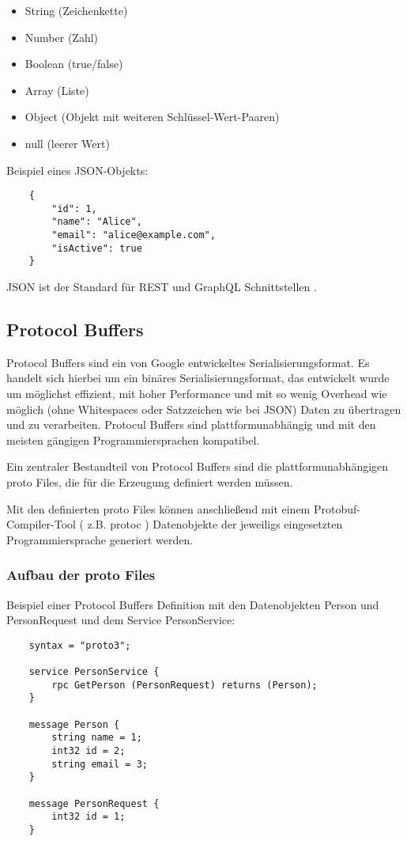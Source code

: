 \begin{itemize}
	\item String (Zeichenkette)
	\item Number (Zahl)
	\item Boolean (true/false)
	\item Array (Liste)
	\item Object (Objekt mit weiteren Schl\"ussel-Wert-Paaren)
	\item null (leerer Wert)
\end{itemize}
\parencite{ecma404-2017}

Beispiel eines JSON-Objekts:
\begin{verbatim}
	{
		"id": 1,
		"name": "Alice",
		"email": "alice@example.com",
		"isActive": true
	}
\end{verbatim}

JSON ist der Standard für REST und GraphQL Schnittstellen \parencite{Microsoft2025,GraphQL2025}. 




\subsection{Protocol Buffers}
Protocol Buffers sind ein von Google entwickeltes Serialisierungsformat. Es handelt sich hierbei um ein binäres Serialisierungsformat, das entwickelt wurde um möglichst effizient, mit hoher Performance und mit so wenig Overhead wie möglich (ohne Whitespaces oder Satzzeichen wie bei JSON) Daten zu übertragen und zu verarbeiten. Protocul Buffers sind plattformunabhängig und mit den meisten gängigen Programmiersprachen kompatibel.

Ein zentraler Bestandteil von Protocol Buffers sind die plattformunabhängigen proto Files, die für die Erzeugung definiert werden müssen.

Mit den definierten proto Files können anschließend mit einem Protobuf-Compiler-Tool ( z.B. protoc ) Datenobjekte der jeweiligs eingesetzten Programmiersprache generiert werden.

\subsubsection*{Aufbau der proto Files}

Beispiel einer Protocol Buffers Definition mit den Datenobjekten Person und PersonRequest und dem Service PersonService:
\begin{verbatim}
	syntax = "proto3";
	
	service PersonService {
		rpc GetPerson (PersonRequest) returns (Person);
	}
	
	message Person {
		string name = 1;
		int32 id = 2;
		string email = 3;
	}
	
	message PersonRequest {
		int32 id = 1;
	}
\end{verbatim}


